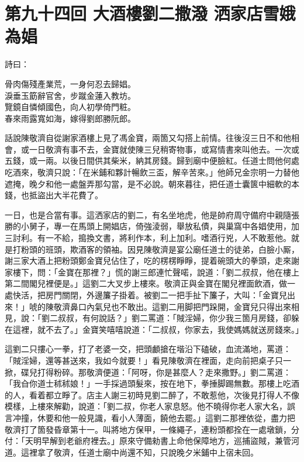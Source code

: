
\chapter*{第九十四回 大酒樓劉二撒潑 洒家店雪娥為娼}


詩曰：

\begin{myquote}
骨肉傷殘產業荒，一身何忍去歸娼。\\淚垂玉筯辭官舍，步蹴金蓮入教坊。\\覽鏡自憐傾國色，向人初學倚門粧。\\春來雨露寬如海，嫁得劉郎勝阮郎。
\end{myquote}

話說陳敬濟自從謝家酒樓上見了馮金寶，兩箇又勾搭上前情。往後沒三日不和他相會，或一日敬濟有事不去，金寶就使陳三兒稍寄物事，或寫情書來叫他去。一次或五錢，或一兩。以後日間供其柴米，納其房錢。歸到廟中便臉紅。任道士問他何處吃酒來，敬濟只說：「在米鋪和夥計暢飲三盃，解辛苦來。」他師兄金宗明一力替他遮掩，晚夕和他一處盤弄那勾當，是不必說。朝來暮往，把任道士囊篋中細軟的本錢，也抵盜出大半花費了。

一日，也是合當有事。這洒家店的劉二，有名坐地虎，他是帥府周守備府中親隨張勝的小舅子，專一在馬頭上開娼店，倚強淩弱，舉放私債，與巢窩中各娼使用，加三討利。有一不給，搗換文書，將利作本，利上加利。嗜酒行兇，人不敢惹他。就是打粉頭的班頭，欺酒客的領袖。因見陳敬濟是宴公廟任道士的徒弟，白臉小厮，謝三家大酒上把粉頭鄭金寶兒佔住了，吃的楞楞睜睜，提着碗頭大的拳頭，{}走來謝家樓下，問：「金寶在那裡？」慌的謝三郎連忙聲喏，說道：「劉二叔叔，他在樓上第二間閣兒裡便是。」這劉二大叉步上樓來。敬濟正與金寶在閣兒裡面飲酒，做一處快活，把房門關閉，外邊簾子掛着。被劉二一把手扯下簾子，大叫：「金寶兒出來！」唬的陳敬濟鼻口內氣兒也不敢出。這劉二用脚把門跺開，金寶兒只得出來相見，說：「劉二叔叔，有何說話？」劉二罵道：「賊淫婦，你少我三箇月房錢，卻躲在這裡，就不去了。」金寶笑嘻嘻說道：「二叔叔，你家去，我使媽媽就送房錢來。」

這劉二只摟心一拳，打了老婆一交，把頭顱搶在堦沿下磕破，血流滿地，罵道：「賊淫婦，還等甚送來，我如今就要！」看見陳敬濟在裡面，走向前把桌子只一掀，碟兒打得粉碎。那敬濟便道：「阿呀，你是甚麼人？走來撒野。」劉二罵道：「我㒲你道士秫秫娘！」一手採過頭髮來，按在地下，拳捶脚踢無數。那樓上吃酒的人，看着都立睜了。店主人謝三初時見劉二醉了，不敢惹他，次後見打得人不像模樣，上樓來解勸，說道：「劉二叔，你老人家息怒。他不曉得你老人家大名，誤言冲撞，休要和他一般見識，看小人薄面，饒他去罷。」這劉二那裡依從，盡力把敬濟打了箇發昏章第十一。叫將地方保甲，一條繩子，連粉頭都拴在一處墩鎖，分付：「天明早解到老爺府裡去。」原來守備勑書上命他保障地方，巡捕盜賊，兼管河道。這裡拿了敬濟，任道士廟中尚還不知，只說晚夕米鋪中上宿未回。

